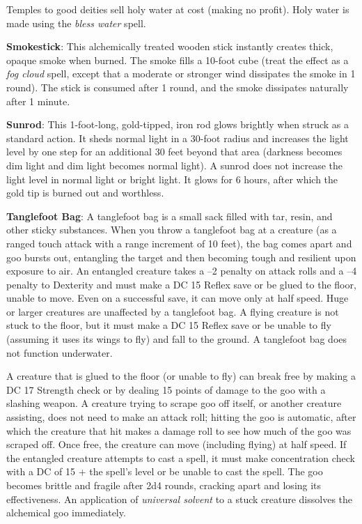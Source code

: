 Temples to good deities sell holy water at cost (making no profit). Holy water is made using the \textit{bless water }spell.
		
\textbf{Smokestick}: This alchemically treated wooden stick instantly creates thick, opaque smoke when burned. The smoke fills a 10-foot cube (treat the effect as a \textit{fog cloud }spell, except that a moderate or stronger wind dissipates the smoke in 1 round). The stick is consumed after 1 round, and the smoke dissipates naturally after 1 minute.
		
\textbf{Sunrod}: This 1-foot-long, gold-tipped, iron rod glows brightly when struck as a standard action. It sheds normal light in a 30-foot radius and increases the light level by one step for an additional 30 feet beyond that area (darkness becomes dim light and dim light becomes normal light). A sunrod does not increase the light level in normal light or bright light. It glows for 6 hours, after which the gold tip is burned out and worthless.
		
\textbf{Tanglefoot Bag}: A tanglefoot bag is a small sack filled with tar, resin, and other sticky substances. When you throw a tanglefoot bag at a creature (as a ranged touch attack with a range increment of 10 feet), the bag comes apart and goo bursts out, entangling the target and then becoming tough and resilient upon exposure to air. An entangled creature takes a --2 penalty on attack rolls and a --4 penalty to Dexterity and must make a DC 15 Reflex save or be glued to the floor, unable to move. Even on a successful save, it can move only at half speed. Huge or larger creatures are unaffected by a tanglefoot bag. A flying creature is not stuck to the floor, but it must make a DC 15 Reflex save or be unable to fly (assuming it uses its wings to fly) and fall to the ground. A tanglefoot bag does not function underwater.
		
A creature that is glued to the floor (or unable to fly) can break free by making a DC 17 Strength check or by dealing 15 points of damage to the goo with a slashing weapon. A creature trying to scrape goo off itself, or another creature assisting, does not need to make an attack roll; hitting the goo is automatic, after which the creature that hit makes a damage roll to see how much of the goo was scraped off. Once free, the creature can move (including flying) at half speed. If the entangled creature attempts to cast a spell, it must make concentration check with a DC of 15 + the spell's level or be unable to cast the spell. The goo becomes brittle and fragile after 2d4 rounds, cracking apart and losing its effectiveness. An application of \textit{universal solvent} to a stuck creature dissolves the alchemical goo immediately.
		
